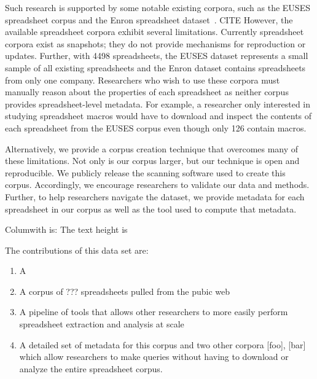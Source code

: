 \documentclass[conference]{IEEEtran}
\begin{document}
Such research is supported by some notable existing corpora, such as the EUSES spreadsheet corpus and the Enron spreadsheet dataset~\cite{Fisher2005}. CITE
However, the available spreadsheet corpora exhibit several limitations.
Currently spreadsheet corpora exist as snapshots; they do not provide mechanisms for reproduction or updates.
Further, with 4498 spreadsheets, the EUSES dataset represents a small sample of all existing spreadsheets and the Enron dataset contains spreadsheets from only one company.
Researchers who wish to use these corpora must manually reason about the properties of each spreadsheet as neither corpus provides spreadsheet-level metadata.
For example, a researcher only interested in studying spreadsheet macros would have to download and inspect the contents of each spreadsheet from the EUSES corpus even though only 126 contain macros.

Alternatively, we provide a corpus creation technique that overcomes many of these limitations. 
Not only is our corpus larger, but our technique is open and reproducible.  
We publicly release the scanning software used to create this corpus.
Accordingly, we encourage researchers to validate our data and methods.
Further, to help researchers navigate the dataset, we provide metadata for each spreadsheet in our corpus as well as the tool used to compute that metadata.

Columwith is: The text height is \the\columnwidth


The contributions of this data set are:

\begin{enumerate}
\item A 
\item A corpus of ??? spreadsheets pulled from the pubic web
\item A pipeline of tools that allows other researchers to more easily perform spreadsheet extraction and analysis at scale
\item A detailed set of metadata for this corpus and two other corpora [foo], [bar]  which allow researchers to make queries without having to download or analyze the entire spreadsheet corpus.  
\end{enumerate}

\end{document}

